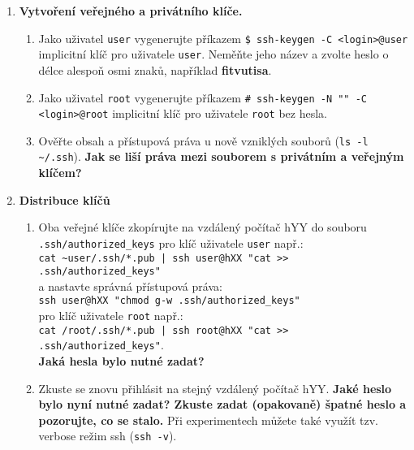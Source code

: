 \documentclass[a4paper,11pt]{article}
\begin{document}
\begin{enumerate}
\begin{enumerate}
    \end{enumerate}

  \item {\bf Vytvoření veřejného a privátního klíče.}

    \begin{enumerate}

      \item Jako uživatel {\tt user} vygenerujte příkazem \verb|$ ssh-keygen -C <login>@user|
        implicitní klíč pro uživatele
        {\tt user}. Neměňte jeho
        název a zvolte heslo o délce alespoň osmi znaků, například
        \textbf{fitvutisa}.

      \item Jako uživatel {\tt root} vygenerujte příkazem \verb|# ssh-keygen -N "" -C <login>@root|
        implicitní klíč pro uživatele {\tt root} bez hesla.

      \item Ověřte obsah a přístupová práva u nově vzniklých souborů (\verb|ls -l ~/.ssh|). {\bf Jak
se liší práva mezi souborem s privátním a veřejným klíčem?}

    \end{enumerate}

  \item {\bf Distribuce klíčů}

    \begin{enumerate}

      \item Oba veřejné klíče zkopírujte na vzdálený počítač hYY do
        souboru \verb|.ssh/authorized_keys|
        pro klíč uživatele {\tt user} např.: \\
        {\verb&cat ~user/.ssh/*.pub | ssh user@hXX "cat >> .ssh/authorized_keys"&}\\
        a nastavte správná přístupová práva:\\
        {\verb&ssh user@hXX "chmod g-w .ssh/authorized_keys"&} \\
        pro klíč uživatele {\tt root} např.: \\
        {\verb&cat /root/.ssh/*.pub | ssh root@hXX "cat >> .ssh/authorized_keys"&}. \\

      {\bf Jaká hesla bylo nutné zadat?}

      \item Zkuste se znovu přihlásit na stejný vzdálený počítač hYY. {\bf Jaké heslo bylo nyní nutné zadat? Zkuste
        zadat (opakovaně) špatné heslo a pozorujte, co se stalo.} Při experimentech můžete také
využít tzv. verbose režim ssh ({\tt ssh -v}).


\end{enumerate}
\end{enumerate}
\end{document}

